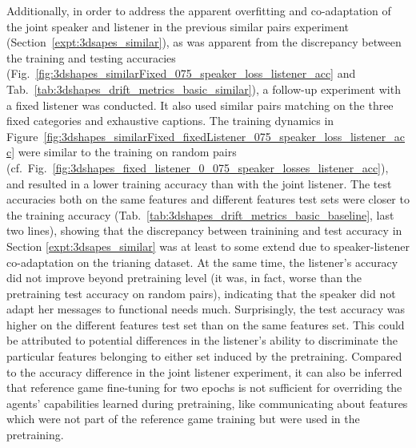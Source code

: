 Additionally, in order to address the apparent overfitting and co-adaptation of the joint speaker and listener in the previous similar pairs experiment (Section~\ref{expt:3dsapes_similar}), as was apparent from the discrepancy between the training and testing accuracies (Fig.~\ref{fig:3dshapes_similarFixed_075_speaker_loss_listener_acc} and Tab.~\ref{tab:3dshapes_drift_metrics_basic_similar}), a follow-up experiment with a fixed listener was conducted. It also used similar pairs matching on the three fixed categories and exhaustive captions. 
The training dynamics in Figure~\ref{fig:3dshapes_similarFixed_fixedListener_075_speaker_loss_listener_acc} were similar to the training on random pairs (cf.~Fig.~\ref{fig:3dshapes_fixed_listener_0_075_speaker_losses_listener_acc}), and resulted in a lower training accuracy than with the joint listener. The test accuracies both on the same features and different features test sets were closer to the training accuracy (Tab.~\ref{tab:3dshapes_drift_metrics_basic_baseline}, last two lines), showing that the discrepancy between trainining and test accuracy in Section \ref{expt:3dsapes_similar} was at least to some extend due to speaker-listener co-adaptation on the trianing dataset. At the same time, the listener's accuracy did not improve beyond pretraining level (it was, in fact, worse than the pretraining test accuracy on random pairs), indicating that the speaker did not adapt her messages to functional needs much. Surprisingly, the test accuracy was higher on the different features test set than on the same features set. This could be attributed to potential differences in the listener's ability to discriminate the particular features belonging to either set induced by the pretraining. Compared to the accuracy difference in the joint listener experiment, it can also be inferred that reference game fine-tuning for two epochs is not sufficient for overriding the agents' capabilities learned during pretraining, like communicating about features which were not part of the reference game training but were used in the pretraining.


